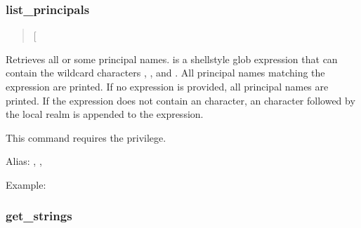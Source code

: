 \documentclass[letterpaper,10pt,english]{sphinxmanual}
\begin{document}
\subsubsection{list\_principals}
\label{\detokenize{admin/admin_commands/kadmin_local:list-principals}}\label{\detokenize{admin/admin_commands/kadmin_local:id8}}\begin{quote}

\sphinxAtStartPar
{} {[}\sphinxstyleemphasis{expression}{]}
\end{quote}

\sphinxAtStartPar
Retrieves all or some principal names.   is a shell\sphinxhyphen{}style
glob expression that can contain the wild\sphinxhyphen{}card characters ,
\sphinxcode{\sphinxupquote{*}}, and \sphinxcode{\sphinxupquote{{[}{]}}}.  All principal names matching the expression are
printed.  If no expression is provided, all principal names are
printed.  If the expression does not contain an  character, an
 character followed by the local realm is appended to the
expression.

\sphinxAtStartPar
This command requires the  privilege.

\sphinxAtStartPar
Alias: , , 

\sphinxAtStartPar
Example:

\begin{sphinxVerbatim}[commandchars=\\\{\}]
   
\end{sphinxVerbatim}


\subsubsection{get\_strings}
\label{\detokenize{admin/admin_commands/kadmin_local:get-strings}}\label{\detokenize{admin/admin_commands/kadmin_local:id9}}\begin{quote}

\sphinxAtStartPar
{} 
\end{quote}
\end{document}

